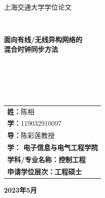 \documentclass[UTF8,a4paper,12pt]{ctexart}
\numberwithin{equation}{section}
\begin{document}
	
	\thispagestyle{empty}
	
	\renewcommand{\headrulewidth}{0pt}
	\begin{figure}[htb] 
	\end{figure}
	
	\begin{center}
		\songti {} 上海交通大学学位论文
	\end{center}
	~\\
	\begin{center}
		\songti {} \textbf{面向有线/无线异构网络的\\混合时钟同步方法}
	\end{center}
	~\\
	~\\
	~\\
	~\\
	\begin{center}
		\heiti {}
		\begin{tabular}{l}
			\textbf{姓：}陈相\\ 
			\textbf{学：}119032910097\\
			\textbf{导：}陈彩莲教授\\
			\textbf{学： 电子信息与电气工程学院}\\
			\textbf{学科/专业名称：控制工程}\\
			\textbf{申请学位层次：工程硕士}\\
		\end{tabular}
	\end{center}
	\vfill
	\vspace{1em}
	
	\begin{center}
		\songti {} \textbf{2023年5月}
	\end{center}
	
\end{document}
